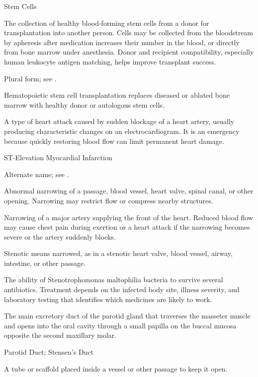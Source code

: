 \synonyms
Stem Cells

 The collection of healthy blood-forming stem cells from a donor for transplantation into another person. Cells may be collected from the bloodstream by apheresis after medication increases their number in the blood, or directly from bone marrow under anesthesia. Donor and recipient compatibility, especially human leukocyte antigen matching, helps improve transplant success.

 Plural form; see .

 Hematopoietic stem cell transplantation replaces diseased or ablated bone marrow
with healthy donor or autologous stem cells.

 A type of heart attack caused by sudden blockage of a heart artery, usually producing characteristic changes on an electrocardiogram. It is an emergency because quickly restoring blood flow can limit permanent heart damage.

\synonyms
ST-Elevation Myocardial Infarction

 Alternate name; see .

 Abnormal narrowing of a passage, blood vessel, heart valve, spinal canal, or other opening. Narrowing may restrict flow or compress nearby structures.

 Narrowing of a major artery supplying the front of the heart. Reduced blood flow may cause chest pain during exertion or a heart attack if the narrowing becomes severe or the artery suddenly blocks.

 Stenotic means narrowed, as in a stenotic heart valve, blood vessel, airway, intestine, or other passage.

 The ability of Stenotrophomonas maltophilia bacteria to survive several antibiotics. Treatment depends on the infected body site, illness severity, and laboratory testing that identifies which medicines are likely to work.

 The main excretory duct of the parotid gland that traverses the masseter muscle and opens into the oral cavity through a small papilla on the buccal mucosa opposite the second maxillary molar.

\synonyms
Parotid Duct; Stensen's Duct

 A tube or scaffold placed inside a vessel or other passage to keep it open.


